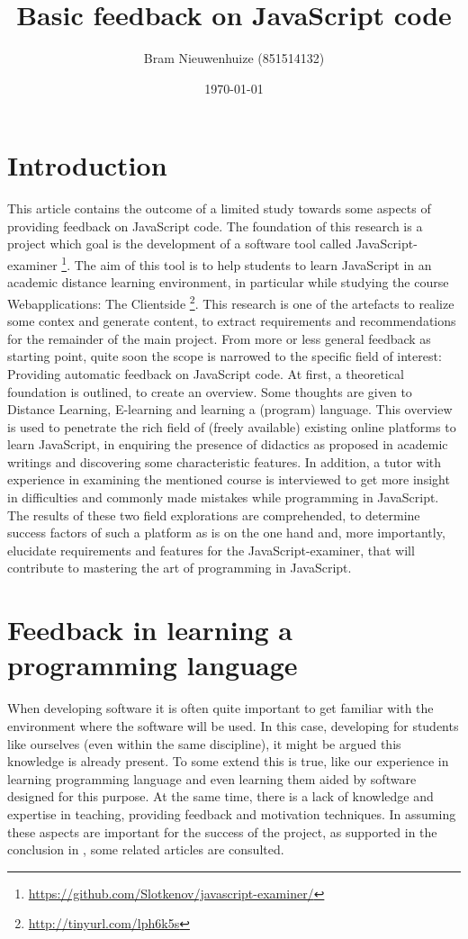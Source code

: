 \documentclass{article}
\begin{document}
 

\title{Basic feedback on JavaScript code} \author{Bram Nieuwenhuize (851514132)} 
\date{\today} \maketitle 

\section{Introduction} This article contains the outcome of a limited study 
towards 
some aspects of providing feedback on JavaScript code. The foundation of this 
research is a project which goal is the development of a software tool called 
JavaScript-examiner
\footnote{\url{https://github.com/Slotkenov/javascript-examiner/}}.
The aim of this tool is to help students to learn 
JavaScript in an academic distance learning environment, in particular
while studying the course Webapplications: The Clientside 
\footnote{\url{http://tinyurl.com/lph6k5s}}. This research is one of 
the artefacts to realize some contex and generate content, to extract 
requirements and recommendations for the remainder of the main project. \newline 
From more or less general feedback as starting point, quite soon the scope is 
narrowed to the specific field of interest: Providing automatic feedback on 
JavaScript code. At first, a theoretical foundation is outlined, to create an 
overview. Some thoughts are given to Distance Learning, E-learning and 
learning a (program) language.
This overview is used to penetrate the rich field of (freely 
available) existing online platforms to learn JavaScript, in enquiring the
presence of didactics as proposed in academic writings and discovering some 
characteristic features. In addition, a tutor with experience in examining
the mentioned course is 
interviewed to get more insight in difficulties and commonly made mistakes while 
programming in JavaScript. The results of these two field explorations are 
comprehended, to determine success factors of such a platform as is on the one 
hand and, more importantly, elucidate requirements and features for the 
JavaScript-examiner, that will contribute to mastering the art of programming in 
JavaScript. 

\section{Feedback in learning a programming language}
When developing software it is often quite important to get familiar with the 
environment where the software will be used. In this case, developing for
students like ourselves (even within the same discipline), it might be argued
this knowledge is already present. To some extend this is true, like our
experience in learning programming language and even learning them aided by 
software designed for this purpose. At the same time, there is a lack of
knowledge and expertise in teaching, providing feedback and 
motivation techniques. In assuming these aspects are important for the success
of the project, as supported in the conclusion in
\citep{al2009investigating}
 , some related articles are consulted.
\end{document}
